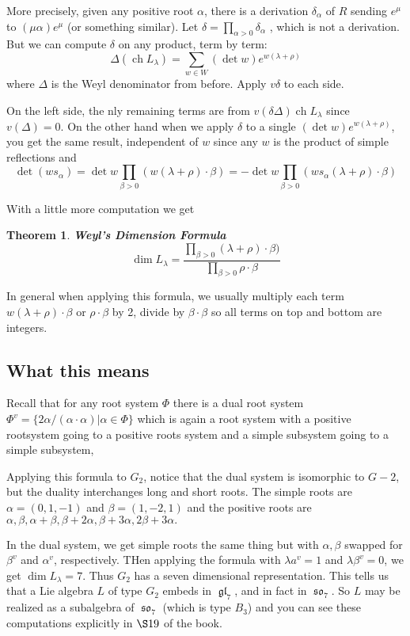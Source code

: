\documentclass[12pt]{article}
\theoremstyle{nonumberbreak}
\theoremstyle{changebreak}
\newtheorem{thm}{Theorem}[subsection]
\theoremstyle{nonumberbreak}
\theoremstyle{change}
\DeclareMathOperator{\ch}{ch}
\DeclareMathOperator{\gl}{\mathfrak{gl}}
\DeclareMathOperator{\so}{\mathfrak{so}}
\begin{document}
More precisely, given any positive root $\alpha$, there is a derivation $\delta_\alpha$ of $R$ sending $e^\mu$ to $(\mu \alpha)e^\mu$ (or something similar).
Let $\delta=\prod_{\alpha>0}\delta_\alpha$ , which is not a derivation. But we can compute $\delta$
on any product, term by term:
\[\Delta(\ch L_\lambda)=\sum_{w\in W}(\det w)e^{w(\lambda+\rho)}\]
where $\Delta$ is the Weyl denominator from before. Apply $v\delta$ to each side.

On the left side, the nly remaining terms are from $v(\delta\Delta)\ch L_\lambda$ since $v(\Delta)=0$.
On the other hand when we apply $\delta$ to a single $(\det w) e^{w(\lambda+\rho)}$, you get the 
same result, independent of $w$ since any $w$ is the product of simple reflections and 
\[\det(ws_\alpha)=\det w\prod_{\beta>0}(w(\lambda+\rho)\cdot \beta)=-\det w\prod_{\beta>0}(ws_\alpha(\lambda+\rho)\cdot \beta)\]

With a little more computation we get 
\begin{thm}
	\textbf{Weyl's Dimension Formula}
	\[\dim L_\lambda =\frac{\prod_{\beta>0}(\lambda+\rho)\cdot\beta)}{\prod_{\beta>0}\rho\cdot \beta}\]
\end{thm}

In general when applying this formula, we usually multiply each term $w(\lambda+\rho)\cdot\beta$ or $\rho\cdot \beta$ by 2, 
divide by $\beta\cdot \beta$ so all terms on top and bottom are integers.

\subsection{What this means}
Recall that for any root system $\Phi$ there is a dual root system $\Phi^v=\{2\alpha/(\alpha\cdot\alpha)|\alpha\in\Phi\}$
which is again a root system with a positive rootsystem going to a positive roots system and a simple subsystem going to a simple subsystem,

Applying this formula to $G_2$, notice that the dual system is isomorphic to $G-2$, but the duality
interchanges long and short roots. The simple roots are $\alpha=(0,1,-1)$ and $\beta=(1,-2,1)$
and the positive roots are $\alpha,\beta,\alpha+\beta,\beta+2\alpha,\beta+3\alpha,2\beta+3\alpha.$

In the dual system, we get simple roots the same thing but with $\alpha,\beta$ swapped for $\beta^v$ and $\alpha^v$, respectively. THen applying the formula 
with $\lambda a^v=1$ and $\lambda\beta^v=0$, we get $\dim L_\lambda=7$. Thus $G_2$ has a seven dimensional representation. This tells us that a Lie algebra $L$ 
of type $G_2$ embeds in $\gl_7$, and in fact in $\so_7$. So $L$ may be realized as a subalgebra of $\so_7$ (which is type $B_3$)
and you can see these computations explicitly in $\S 19$ of the book.
\end{document}
